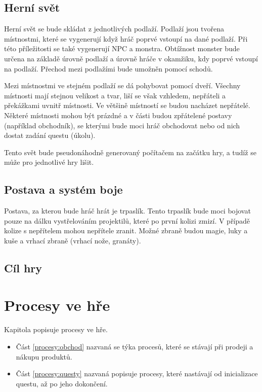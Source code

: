 \documentclass[12pt,a4paper]{article}
\begin{document}
\subsection{Herní svět}
Herní svět se bude skládat z jednotlivých podlaží. Podlaží jsou tvořena
místnostmi, které se vygenerují když hráč poprvé vstoupí na dané podlaží. Při
této příležitosti se také vygenerují NPC a monstra. Obtížnost monster bude
určena na základě úrovně podlaží a úrovně hráče v okamžiku, kdy poprvé vstoupí
na podlaží. Přechod mezi podlažími bude umožněn pomocí schodů.

Mezi místnostmi ve stejném podlaží se dá pohybovat pomocí dveří. Všechny
místnosti mají stejnou velikost a tvar, liší se však vzhledem, nepřáteli a
překážkami uvnitř místnosti. Ve většině místností se budou nacházet nepřátelé.
Některé místnosti mohou být prázdné a v části budou zpřátelené postavy (například
obchodník), se kterými bude moci hráč obchodovat nebo od nich dostat zadání
questu (úkolu).

Tento svět bude pseudonáhodně generovaný počítačem na začátku hry, a tudíž se
může pro jednotlivé hry lišit.

\subsection{Postava a systém boje}
Postava, za kterou bude hráč hrát je trpaslík. Tento trpaslík bude moci bojovat
pouze na dálku vystřelováním projektilů, které po první kolizi zmizí. V případě
kolize s nepřítelem mohou nepřítele zranit. Možné zbraně budou magie, luky a
kuše a vrhací zbraně (vrhací nože, granáty).

\subsection{Cíl hry}




\section{Procesy ve hře}
Kapitola popisuje procesy ve hře.
\begin{itemize}
  \item{Část \ref{procesy:obchod} nazvaná  se týka procesů,
    které se stávají při prodeji a nákupu produktů.}
  \item{Část \ref{procesy:questy} nazvaná  popisuje procesy, které
    nastávají od inicializace questu, až po jeho dokončení.}
\end{itemize}
\end{document}
